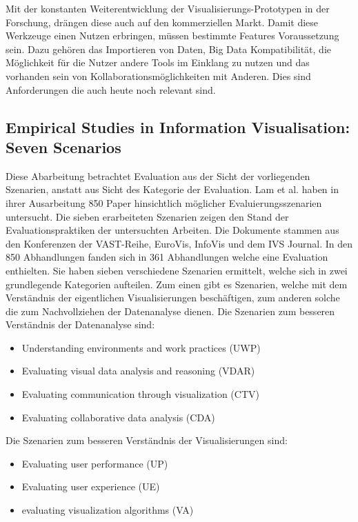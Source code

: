 \documentclass[draft=false
              ,paper=a4
              ,twoside=false
              ,fontsize=11pt
              ,headsepline
              ,BCOR10mm
              ,DIV11
              ]{scrbook}
\begin{document}
Mit der konstanten Weiterentwicklung der Visualisierungs-Prototypen in der Forschung, drängen diese auch auf den kommerziellen Markt. Damit diese Werkzeuge einen Nutzen erbringen, müssen bestimmte Features Voraussetzung sein. Dazu gehören das Importieren von Daten, Big Data Kompatibilität, die Möglichkeit für die Nutzer andere Tools im Einklang zu nutzen und das vorhanden sein von Kollaborationsmöglichkeiten mit Anderen. Dies sind Anforderungen die auch heute noch relevant sind.

\subsection{Empirical Studies in Information Visualisation: Seven Scenarios} %
\label{sub:empirical_studies_in_information_visualisation_seven_scenarios}
Diese Abarbeitung betrachtet Evaluation aus der Sicht der vorliegenden Szenarien, anstatt aus Sicht des Kategorie der Evaluation. Lam et al. haben in ihrer Ausarbeitung \cite{lam_empirical_2012} 850 Paper hinsichtlich möglicher Evaluierungsszenarien untersucht. Die sieben erarbeiteten Szenarien zeigen den Stand der Evaluationspraktiken der untersuchten Arbeiten. Die Dokumente stammen aus den Konferenzen der VAST-Reihe, EuroVis, InfoVis und dem IVS Journal. In den 850 Abhandlungen fanden sich in 361 Abhandlungen welche eine Evaluation enthielten. Sie haben sieben verschiedene Szenarien ermittelt, welche sich in zwei grundlegende Kategorien aufteilen. Zum einen gibt es Szenarien, welche mit dem Verständnis der eigentlichen Visualisierungen beschäftigen, zum anderen solche die zum Nachvollziehen der Datenanalyse dienen. 
Die Szenarien zum besseren Verständnis der Datenanalyse sind:

\begin{itemize}
  \item Understanding environments and work practices (UWP)
  \item Evaluating visual data analysis and reasoning (VDAR)
  \item Evaluating communication through visualization (CTV)
  \item Evaluating collaborative data analysis (CDA)
\end{itemize}

Die Szenarien zum besseren Verständnis der Visualisierungen sind:

\begin{itemize}
  \item Evaluating user performance (UP)
  \item Evaluating user experience (UE)
  \item evaluating visualization algorithms (VA)
\end{itemize}
\end{document}
